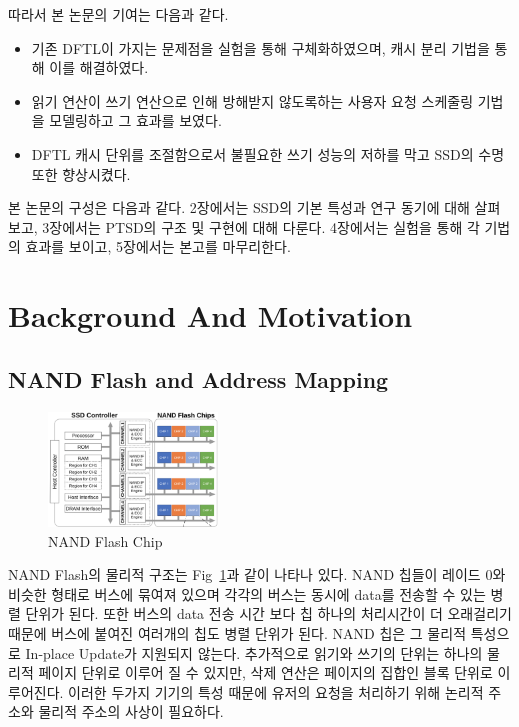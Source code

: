 \documentclass[conference]{IEEEtran}
\begin{document}
따라서 본 논문의 기여는 다음과 같다.
\begin{itemize}
	\item{기존 DFTL이 가지는 문제점을 실험을 통해 구체화하였으며, 캐시 분리 기법을 통해 이를 해결하였다.}
	\item{읽기 연산이 쓰기 연산으로 인해 방해받지 않도록하는 사용자 요청 스케줄링 기법을 모델링하고 그 효과를 보였다.}
	\item{DFTL 캐시 단위를 조절함으로서 불필요한 쓰기 성능의 저하를 막고 SSD의 수명 또한 향상시켰다.}
\end{itemize}
\par

본 논문의 구성은 다음과 같다. 2장에서는 SSD의 기본 특성과 연구 동기에 대해 살펴보고, 3장에서는 PTSD의 구조 및
구현에 대해 다룬다. 4장에서는 실험을 통해 각 기법의 효과를 보이고, 5장에서는 본고를 마무리한다.


\section{Background And Motivation}
\subsection{NAND Flash and Address Mapping}
\begin{figure}[h]
	\centering
	\includegraphics[width=0.4\textwidth]{image/bg/chips.png}
	\caption{NAND Flash Chip \cite{b1}}
	\label{fig:chips}
\end{figure}
NAND Flash의 물리적 구조는 Fig~\ref{fig:chips}과 같이 나타나 있다. NAND 칩들이 레이드 0와 비슷한
형태로 버스에 묶여져 있으며 각각의 버스는 동시에 data를 전송할 수 있는 병렬 단위가 된다.
또한 버스의 data 전송 시간 보다 칩 하나의 처리시간이 더 오래걸리기 때문에 버스에 붙여진 여러개의 칩도
병렬 단위가 된다. NAND 칩은 그 물리적 특성으로 In-place Update가 지원되지 않는다. 추가적으로
읽기와 쓰기의 단위는 하나의 물리적 페이지 단위로 이루어 질 수 있지만, 삭제 연산은 페이지의 집합인
블록 단위로 이루어진다. 이러한 두가지 기기의 특성 때문에 유저의 요청을 처리하기 위해
논리적 주소와 물리적 주소의 사상이 필요하다. \par
\end{document}
